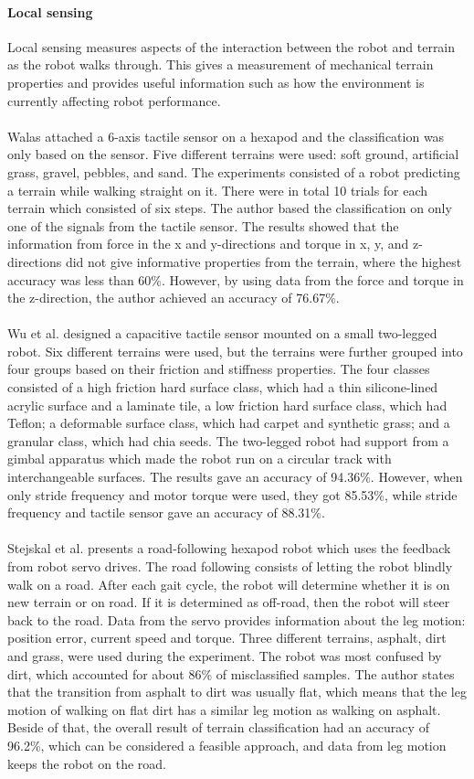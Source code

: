 \documentclass[USenglish]{ifimaster}  %
\begin{document}
\paragraph{Local sensing}
Local sensing measures aspects of the interaction between the robot and terrain as the robot walks through. This gives a measurement of mechanical terrain properties and provides useful information such as how the environment is currently affecting robot performance. 
\\
\\
Walas \cite{walastactile} attached a 6-axis tactile sensor on a hexapod and the classification was only based on the sensor. Five different terrains were used: soft ground, artificial grass, gravel, pebbles, and sand. The experiments consisted of a robot predicting a terrain while walking straight on it. There were in total 10 trials for each terrain which consisted of six steps. The author based the classification on only one of the signals from the tactile sensor. The results showed that the information from force in the x and y-directions and torque in x, y, and z-directions did not give informative properties
from the terrain, where the highest accuracy was less than 60\%. However, by using data from the force and torque in the z-direction, the author achieved an accuracy of 76.67\%.
\\
\\
Wu et al. \cite{7397881} designed a capacitive tactile sensor mounted on a small two-legged robot. Six different terrains were used, but the terrains were further grouped into four groups based on their friction and stiffness properties. The four classes consisted of a high friction hard surface class, which had a thin silicone-lined acrylic surface and a laminate tile, a low friction hard surface class, which had Teflon; a deformable surface class, which had carpet and synthetic grass; and a granular class, which had chia seeds. The two-legged robot had support from a gimbal apparatus which made the robot run on a circular track with interchangeable surfaces. The results gave an accuracy of 94.36\%. However, when only stride frequency and motor torque were used, they got 85.53\%, while stride frequency and tactile sensor gave an accuracy of 88.31\%.
\\
\\ 
Stejskal et al. \cite{7487544} presents a road-following hexapod robot which uses the feedback from robot servo drives. The road following consists of letting the robot blindly walk on a road. After each gait cycle, the robot will determine whether it is on new terrain or on road. If it is determined as off-road, then the robot will steer back to the road. Data from the servo provides information about the leg motion: position error, current speed and torque. Three different terrains, asphalt, dirt and grass, were used during the experiment. The robot was most confused by dirt, which accounted for about 86\% of misclassified samples. The author states that the transition from asphalt to dirt was usually flat, which means that the leg motion of walking on flat dirt has a similar leg motion as walking on asphalt. Beside of that, the overall result of terrain classification had an accuracy of 96.2\%, which can be considered a feasible approach, and data from leg motion keeps the robot on the road.
\end{document}
